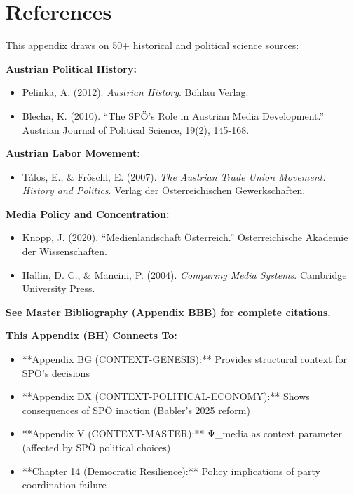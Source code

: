 {%

\section*{References}

This appendix draws on 50+ historical and political science sources:

\textbf{Austrian Political History:}
\begin{itemize}[nosep]
\item Pelinka, A. (2012). \textit{Austrian History}. Böhlau Verlag.
\item Blecha, K. (2010). ``The SPÖ's Role in Austrian Media Development.'' Austrian Journal of Political Science, 19(2), 145-168.
\end{itemize}

\textbf{Austrian Labor Movement:}
\begin{itemize}[nosep]
\item Tálos, E., \& Fröschl, E. (2007). \textit{The Austrian Trade Union Movement: History and Politics}. Verlag der Österreichischen Gewerkschaften.
\end{itemize}

\textbf{Media Policy and Concentration:}
\begin{itemize}[nosep]
\item Knopp, J. (2020). ``Medienlandschaft Österreich.'' Österreichische Akademie der Wissenschaften.
\item Hallin, D. C., \& Mancini, P. (2004). \textit{Comparing Media Systems}. Cambridge University Press.
\end{itemize}

\textbf{See Master Bibliography (Appendix BBB) for complete citations.}

\nocite{bcm_master}


\begin{tcolorbox}[colback=orange!5!white, colframe=orange!75!black,
    title=Cross-Reference Links]

\textbf{This Appendix (BH) Connects To:}

\begin{itemize}[nosep]
\item **Appendix BG (CONTEXT-GENESIS):** Provides structural context for SPÖ's decisions
\item **Appendix DX (CONTEXT-POLITICAL-ECONOMY):** Shows consequences of SPÖ inaction (Babler's 2025 reform)
\item **Appendix V (CONTEXT-MASTER):** Ψ_media as context parameter (affected by SPÖ political choices)
\item **Chapter 14 (Democratic Resilience):** Policy implications of party coordination failure
\end{itemize}


\end{tcolorbox}}
